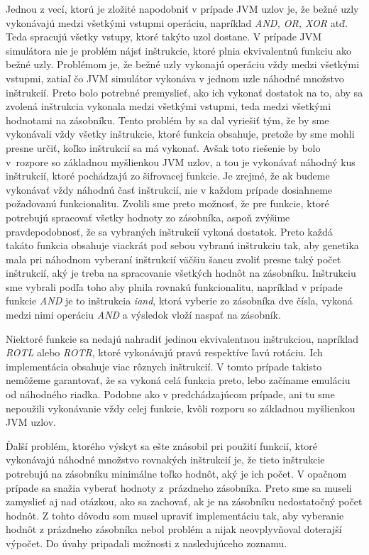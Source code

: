 Jednou z vecí, ktorú je zložité napodobniť v prípade JVM uzlov je, že bežné uzly vykonávajú medzi všetkými vstupmi operáciu, napríklad \textit{AND, OR, XOR} atď. Teda spracujú všetky vstupy, ktoré takýto uzol dostane. V prípade JVM simulátora nie je problém nájsť inštrukcie, ktoré plnia ekvivalentnú funkciu ako bežné uzly. Problémom je, že bežné uzly vykonajú operáciu vždy medzi všetkými vstupmi, zatiaľ čo JVM simulátor vykonáva v jednom uzle náhodné množstvo inštrukcií. Preto bolo potrebné premyslieť, ako ich vykonať dostatok na to, aby sa zvolená inštrukcia vykonala medzi všetkými vstupmi, teda medzi všetkými hodnotami na zásobníku. Tento problém by sa dal vyriešiť tým, že by sme vykonávali vždy všetky inštrukcie, ktoré funkcia obsahuje, pretože by sme mohli presne určiť, koľko inštrukcií sa má vykonať. Avšak toto riešenie by bolo v~rozpore so základnou myšlienkou JVM uzlov, a tou je vykonávať náhodný kus inštrukcií, ktoré pochádzajú zo šifrovacej funkcie. Je zrejmé, že ak budeme vykonávať vždy náhodnú časť inštrukcií, nie v každom prípade dosiahneme požadovanú funkcionalitu. Zvolili sme preto možnosť, že pre funkcie, ktoré potrebujú spracovať všetky hodnoty zo zásobníka, aspoň zvýšime pravdepodobnosť, že sa vybraných inštrukcií vykoná dostatok. Preto každá takáto funkcia obsahuje viackrát pod sebou vybranú inštrukciu tak, aby genetika mala pri náhodnom vyberaní inštrukcií väčšiu šancu zvoliť presne taký počet inštrukcií, aký je treba na spracovanie všetkých hodnôt na zásobníku. Inštrukciu sme vybrali podľa toho aby plnila rovnakú funkcionalitu, napríklad v prípade funkcie \textit{AND} je to inštrukcia \textit{iand}, ktorá vyberie zo zásobníka dve čísla, vykoná medzi nimi operáciu \textit{AND} a výsledok vloží naspať na zásobník. 

Niektoré funkcie sa nedajú nahradiť jedinou ekvivalentnou inštrukciou, napríklad \textit{ROTL} alebo \textit{ROTR}, ktoré vykonávajú pravú respektíve ľavú rotáciu. Ich implementácia obsahuje viac rôznych inštrukcií. V tomto prípade takisto nemôžeme garantovať, že sa vykoná celá funkcia preto, lebo začíname emuláciu od náhodného riadka. Podobne ako v predchádzajúcom prípade, ani tu sme nepoužili vykonávanie vždy celej funkcie, kvôli rozporu so základnou myšlienkou JVM uzlov.

Ďalší problém, ktorého výskyt sa ešte znásobil pri použití funkcií, ktoré vykonávajú náhodné množstvo rovnakých inštrukcií je, že tieto inštrukcie potrebujú na zásobníku minimálne toľko hodnôt, aký je ich počet. V opačnom prípade sa snažia vyberať hodnoty z~prázdneho zásobníka. Preto sme sa museli zamyslieť aj nad otázkou, ako sa zachovať, ak je na zásobníku nedostatočný počet hodnôt. Z tohto dôvodu som musel upraviť implementáciu tak, aby vyberanie hodnôt z prázdneho zásobníka nebol problém a nijak neovplyvňoval doterajší výpočet. Do úvahy pripadali možnosti z nasledujúceho zoznamu.

